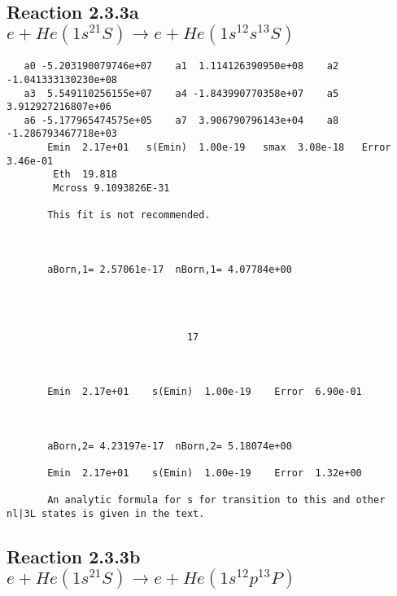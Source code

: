 \documentclass[12pt,dvipdfm]{article}
\begin{document}
\newpage
\subsection{
Reaction 2.3.3a $e + He(1s^21S) \rightarrow e + He(1s^12s^13S)$}

















\begin{small}\begin{verbatim}
   a0 -5.203190079746e+07    a1  1.114126390950e+08    a2 -1.041333130230e+08
   a3  5.549110256155e+07    a4 -1.843990770358e+07    a5  3.912927216807e+06
   a6 -5.177965474575e+05    a7  3.906790796143e+04    a8 -1.286793467718e+03
       Emin  2.17e+01   s(Emin)  1.00e-19   smax  3.08e-18   Error  3.46e-01
        Eth  19.818
        Mcross 9.1093826E-31

       This fit is not recommended.



       aBorn,1= 2.57061e-17  nBorn,1= 4.07784e+00




                               17



       Emin  2.17e+01    s(Emin)  1.00e-19    Error  6.90e-01



       aBorn,2= 4.23197e-17  nBorn,2= 5.18074e+00

       Emin  2.17e+01    s(Emin)  1.00e-19    Error  1.32e+00

       An analytic formula for s for transition to this and other nl|3L states is given in the text.
\end{verbatim}\end{small}




\newpage
\subsection{
Reaction 2.3.3b $e + He(1s^21S) \rightarrow e + He(1s^12p^13P)$}






\end{document}
